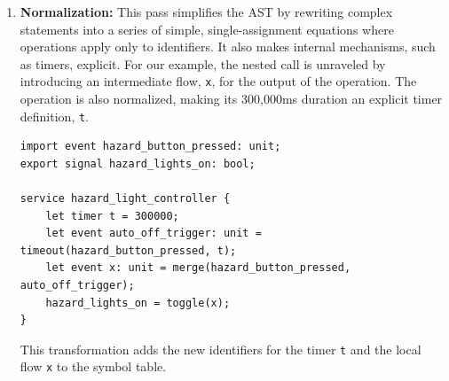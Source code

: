 \begin{enumerate}
          The central challenge is managing the  operator, which introduces a
          \emph{continuous} flow whose value changes at every execution step. In an event-driven
          system, this can lead to \emph{oversampling}---where a service is executed due to an
          unrelated input---causing time-dependent logic to produce inconsistent results.

          To prevent this, the reactive type system classifies all flows as either \emph{continuous}
          or \emph{discrete}. It enforces strict rules, for instance, by ensuring that the inputs
          and outputs of stateful components are discrete. This discipline guarantees that the
          behavior of a service is determined by its declared data dependencies, not by the
          arbitrary timing of its execution. The soundness of this approach is formally established
          by the \emph{Oversampling Theorem} ().

    \item \textbf{Normalization:} This pass simplifies the AST by rewriting complex statements into
          a series of simple, single-assignment equations where operations apply only to
          identifiers. It also makes internal mechanisms, such as timers, explicit. For our example,
          the nested call is unraveled by introducing an intermediate flow, \texttt{x}, for the
          output of the  operation. The  operation is also normalized,
          making its 300,000ms duration an explicit timer definition, \texttt{t}.

          \begin{lstlisting}[language=GRust]
import event hazard_button_pressed: unit;
export signal hazard_lights_on: bool;

service hazard_light_controller {
    let timer t = 300000;
    let event auto_off_trigger: unit = timeout(hazard_button_pressed, t);
    let event x: unit = merge(hazard_button_pressed, auto_off_trigger);
    hazard_lights_on = toggle(x);
}
\end{lstlisting}
          This transformation adds the new identifiers for the timer \texttt{t} and the local flow
          \texttt{x} to the symbol table.


\end{enumerate}

